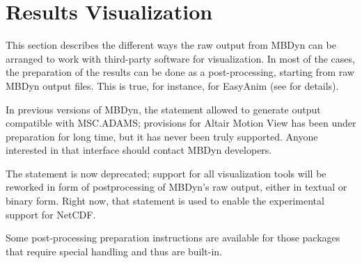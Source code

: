 %
%
%
%
%
% 
%
%

\chapter{Results Visualization}
\label{sec:APP:OUTPUTRESULTS}
This section describes the different ways the raw output from MBDyn
can be arranged to work with third-party software for visualization.
In most of the cases, the preparation of the results can be done 
as a post-processing, starting from raw MBDyn output files.
This is true, for instance, for EasyAnim (see
for details).

In previous versions of MBDyn, the  statement
allowed to generate output compatible with MSC.ADAMS; provisions 
for Altair Motion View has been under preparation for long time,
but it has never been truly supported.
Anyone interested in that interface should contact MBDyn developers.

\noindent
The  statement is now deprecated;
support for all visualization tools will be reworked
in form of postprocessing of MBDyn's raw output, either in textual
or binary form. %
Right now, that statement is used to enable the experimental support
for NetCDF.

\noindent
Some post-processing preparation instructions are available
for those packages that require special handling and thus
are built-in.


